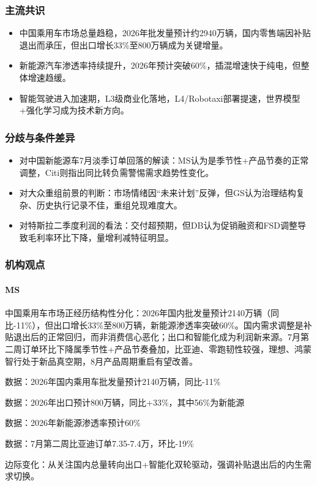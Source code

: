 \documentclass[11pt]{ctexart}
\begin{document}
\subsubsection*{主流共识}
\begin{itemize}
  \item 中国乘用车市场总量趋稳，2026年批发量预计约2940万辆，国内零售端因补贴退出而承压，但出口增长33\%至800万辆成为关键增量。
  \item 新能源汽车渗透率持续提升，2026年预计突破60\%，插混增速快于纯电，但整体增速趋缓。
  \item 智能驾驶进入加速期，L3级商业化落地，L4/Robotaxi部署提速，世界模型+强化学习成为技术新方向。
\end{itemize}
\subsubsection*{分歧与条件差异}
\begin{itemize}
  \item 对中国新能源车7月淡季订单回落的解读：MS认为是季节性+产品节奏的正常调整，Citi则指出同比转负需警惕需求趋势性变化。
  \item 对大众重组前景的判断：市场情绪因“未来计划”反弹，但GS认为治理结构复杂、历史执行记录不佳，重组兑现难度大。
  \item 对特斯拉二季度利润的看法：交付超预期，但DB认为促销融资和FSD调整导致毛利率环比下降，量增利减特征明显。
\end{itemize}
\subsubsection*{机构观点}
\paragraph{MS} 中国乘用车市场正经历结构性分化：2026年国内批发量预计2140万辆（同比-11\%），但出口增长33\%至800万辆，新能源渗透率突破60\%。国内需求调整是补贴退出后的正常回归，而非消费信心恶化；出口和智能化成为利润新来源。7月第二周订单环比下降属季节性+产品节奏叠加，比亚迪、零跑韧性较强，理想、鸿蒙智行处于新品真空期，8月产品周期重启有望改善。
{\small\color{refgray}数据：2026年国内乘用车批发量预计2140万辆，同比-11\%\par}
{\small\color{refgray}数据：2026年出口预计800万辆，同比+33\%，其中56\%为新能源\par}
{\small\color{refgray}数据：2026年新能源渗透率预计60\%\par}
{\small\color{refgray}数据：7月第二周比亚迪订单7.35-7.4万，环比-19\%\par}
{\small\color{refgray}边际变化：从关注国内总量转向出口+智能化双轮驱动，强调补贴退出后的内生需求切换。\par}
\end{document}
